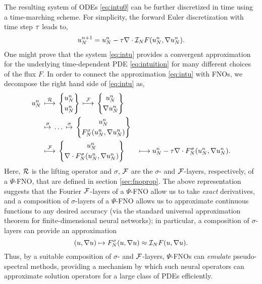 \documentclass[reqno,a4paper]{amsart}
\begin{document}
The resulting system of ODEs \eqref{eq:intu0} can be further discretized in time using a time-marching scheme. For simplicity, the forward Euler discretization with time step ${\tau}$ leads to,
\begin{align} \label{eq:intu}
u^{n+1}_N = u^n_N - {\tau}\nabla \cdot \mathcal{I}_N F(u^n_N, \nabla u^n_N).
\end{align}
One might prove that the system \eqref{eq:intu} provides a convergent approximation for the underlying time-dependent PDE \eqref{eq:intuition} for many different choices of the flux $F$. 
In order to connect the approximation \eqref{eq:intu} with FNOs, we decompose the right hand side of \eqref{eq:intu} as, 
\begin{alignat*}{2}
u^n_N
&\,\overset{\mathcal{R}}{\longmapsto}\,
\begin{Bmatrix}
u^n_N \\[3pt]
u^n_N
\end{Bmatrix}
\,\overset{\mathcal{F}}{\longmapsto }\,
\begin{Bmatrix}
u^n_N \\[3pt]
\nabla u^n_N
\end{Bmatrix}
&&
\\
&
\,\overset{\sigma}{\mapsto }\,
\dots
\,\overset{\sigma}{\mapsto }\,
\begin{Bmatrix}
u^n_N \\[3pt]
F^\sigma_N(u^n_N,\nabla u^n_N)
\end{Bmatrix}
&&
\\
&\,\overset{\mathcal{F}}{\longmapsto }\,
\begin{Bmatrix}
u^n_N \\[3pt]
\nabla \cdot F^\sigma_N(u^n_N,\nabla u^n_N)
\end{Bmatrix}
&&\,{\longmapsto }\;
u^n_N - {\tau} \nabla \cdot F^\sigma_N(u^n_N,\nabla u^n_N).
\end{alignat*}
Here,  $\mathcal{R}$ is the lifting operator and $\sigma$, $\mathcal{F}$ are the $\sigma$- and $\mathcal{F}$-layers, respectively, of a $\Psi$-FNO, that are defined in section \ref{sec:fnoprop}. The above representation suggests that the Fourier $\mathcal{F}$-layers of a $\Psi$-FNO allow us to take \emph{exact} derivatives, and a composition of $\sigma$-layers of a $\Psi$-FNO allows us to approximate continuous functions to any desired accuracy (via the standard universal approximation theorem for finite-dimensional neural networks); in particular, a composition of $\sigma$-layers can provide an approximation 
\[
(u,\nabla u) \mapsto F^\sigma_N(u, \nabla u) \approx \mathcal{I}_N F(u,\nabla u).
\] 
Thus, by a suitable composition of $\sigma$- and $\mathcal{F}$-layers, $\Psi$-FNOs can \emph{emulate} pseudo-spectral methods, providing a mechanism by which such neural operators can approximate solution operators for a large class of PDEs efficiently. 
\end{document}
